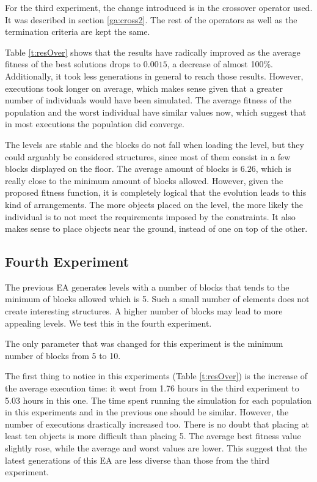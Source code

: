 For the third experiment, the change introduced is in the crossover operator used. It was described in section \ref{ga:cross2}. The rest of the operators as well as the termination criteria are kept the same. 


Table \ref{t:resOver} shows that the results have radically improved as the average fitness of the best solutions drops to $0.0015$, a decrease of almost 100\%. Additionally, it took less generations in general to reach those results. However, executions took longer on average, which makes sense given that a greater number of individuals would have been simulated. The average fitness of the population and the worst individual have similar values now, which suggest that in most executions the population did converge.

The levels are stable and the blocks do not fall when loading the level, but they could arguably be considered structures, since most of them consist in a few blocks displayed on the floor. The average amount of blocks is $6.26$, which is really close to the minimum amount of blocks allowed. However, given the proposed fitness function, it is completely logical that the evolution leads to this kind of arrangements. The more objects placed on the level, the more likely the individual is to not meet the requirements imposed by the constraints. It also makes sense to place objects near the ground, instead of one on top of the other.

\subsection{Fourth Experiment}
The previous EA generates levels with a number of blocks that tends to the minimum of blocks allowed which is 5. Such a small number of elements does not create interesting structures. A higher number of blocks may lead to more appealing levels. We test this in the fourth experiment.


The only parameter that was changed for this experiment is the minimum number of blocks from 5 to 10. 


The first thing to notice in this experiments (Table \ref{t:resOver}) is the increase of the average execution time: it went from 1.76 hours in the third experiment to 5.03 hours in this one. The time spent running the simulation for each population in this experiments and in the previous one should be similar. However, the number of executions drastically increased too. There is no doubt that placing at least ten objects is more difficult than placing 5. The average best fitness value slightly rose, while the average and worst values are lower. This suggest that the latest generations of this EA are less diverse than those from the third experiment.



